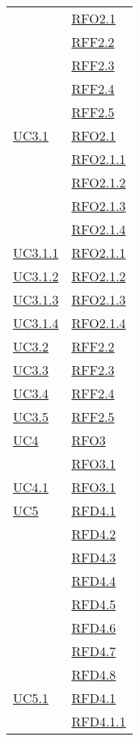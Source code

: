 \begin{longtable}{|>{\centering}m{5cm}|m{5cm}<{\centering}|}
& \hyperlink{RFO2.1}{RFO2.1}\\
& \hyperlink{RFF2.2}{RFF2.2}\\
& \hyperlink{RFF2.3}{RFF2.3}\\
& \hyperlink{RFF2.4}{RFF2.4}\\
& \hyperlink{RFF2.5}{RFF2.5}\\ \hline
\hyperref[UC3.1]{UC3.1} & \hyperlink{RFO2.1}{RFO2.1}\\
& \hyperlink{RFO2.1.1}{RFO2.1.1}\\
& \hyperlink{RFO2.1.2}{RFO2.1.2}\\
& \hyperlink{RFO2.1.3}{RFO2.1.3}\\
& \hyperlink{RFO2.1.4}{RFO2.1.4}\\ \hline
\hyperref[UC3.1.1]{UC3.1.1} & \hyperlink{RFO2.1.1}{RFO2.1.1}\\ \hline
\hyperref[UC3.1.2]{UC3.1.2} & \hyperlink{RFO2.1.2}{RFO2.1.2}\\ \hline
\hyperref[UC3.1.3]{UC3.1.3} & \hyperlink{RFO2.1.3}{RFO2.1.3}\\ \hline
\hyperref[UC3.1.4]{UC3.1.4} & \hyperlink{RFO2.1.4}{RFO2.1.4}\\ \hline
\hyperref[UC3.2]{UC3.2} & \hyperlink{RFF2.2}{RFF2.2}\\ \hline
\hyperref[UC3.3]{UC3.3} & \hyperlink{RFF2.3}{RFF2.3}\\ \hline
\hyperref[UC3.4]{UC3.4} & \hyperlink{RFF2.4}{RFF2.4}\\ \hline
\hyperref[UC3.5]{UC3.5} & \hyperlink{RFF2.5}{RFF2.5}\\ \hline
\hyperref[UC4]{UC4} & \hyperlink{RFO3}{RFO3}\\
& \hyperlink{RFO3.1}{RFO3.1}\\ \hline
\hyperref[UC4.1]{UC4.1} & \hyperlink{RFO3.1}{RFO3.1}\\ \hline
\hyperref[UC5]{UC5} & \hyperlink{RFD4.1}{RFD4.1}\\
& \hyperlink{RFD4.2}{RFD4.2}\\
& \hyperlink{RFD4.3}{RFD4.3}\\
& \hyperlink{RFD4.4}{RFD4.4}\\
& \hyperlink{RFD4.5}{RFD4.5}\\
& \hyperlink{RFD4.6}{RFD4.6}\\
& \hyperlink{RFD4.7}{RFD4.7}\\
& \hyperlink{RFD4.8}{RFD4.8}\\ \hline
\hyperref[UC5.1]{UC5.1} & \hyperlink{RFD4.1}{RFD4.1}\\
& \hyperlink{RFD4.1.1}{RFD4.1.1}\\

\end{longtable}
